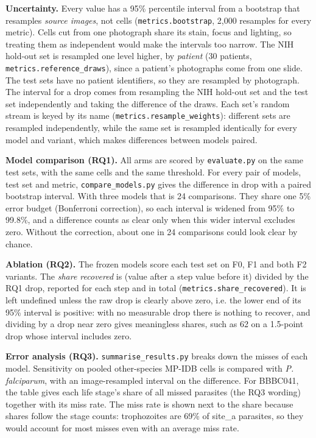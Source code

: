\documentclass[11pt,a4paper]{article}
\begin{document}
\textbf{Uncertainty.} Every value has a 95\% percentile interval from a bootstrap that resamples \emph{source images}, not cells (\texttt{metrics.\allowbreak{}bootstrap}, 2,000 resamples for every metric). Cells cut from one photograph share its stain, focus and lighting, so treating them as independent would make the intervals too narrow. The NIH hold-out set is resampled one level higher, by \emph{patient} (30 patients, \texttt{metrics.\allowbreak{}reference\_\allowbreak{}draws}), since a patient's photographs come from one slide. The test sets have no patient identifiers, so they are resampled by photograph. The interval for a drop comes from resampling the NIH hold-out set and the test set independently and taking the difference of the draws. Each set's random stream is keyed by its name (\texttt{metrics.\allowbreak{}resample\_\allowbreak{}weights}): different sets are resampled independently, while the same set is resampled identically for every model and variant, which makes differences between models paired.

\textbf{Model comparison (RQ1).} All arms are scored by \texttt{evaluate.\allowbreak{}py} on the same test sets, with the same cells and the same threshold. For every pair of models, test set and metric, \texttt{compare\_\allowbreak{}models.\allowbreak{}py} gives the difference in drop with a paired bootstrap interval. With three models that is 24 comparisons. They share one 5\% error budget (Bonferroni correction), so each interval is widened from 95\% to 99.8\%, and a difference counts as clear only when this wider interval excludes zero. Without the correction, about one in 24 comparisons could look clear by chance.

\textbf{Ablation (RQ2).} The frozen models score each test set on F0, F1 and both F2 variants. The \emph{share recovered} is (value after a step \textminus{} value before it) divided by the RQ1 drop, reported for each step and in total (\texttt{metrics.\allowbreak{}share\_\allowbreak{}recovered}). It is left undefined unless the raw drop is clearly above zero, i.e. the lower end of its 95\% interval is positive: with no measurable drop there is nothing to recover, and dividing by a drop near zero gives meaningless shares, such as \textminus{}62 on a 1.5-point drop whose interval includes zero.

\textbf{Error analysis (RQ3).} \texttt{summarise\_\allowbreak{}results.\allowbreak{}py} breaks down the misses of each model. Sensitivity on pooled other-species MP-IDB cells is compared with \emph{P. falciparum}, with an image-resampled interval on the difference. For BBBC041, the table gives each life stage's share of all missed parasites (the RQ3 wording) together with its miss rate. The miss rate is shown next to the share because shares follow the stage counts: trophozoites are 69\% of site\_\allowbreak{}a parasites, so they would account for most misses even with an average miss rate.
\end{document}
